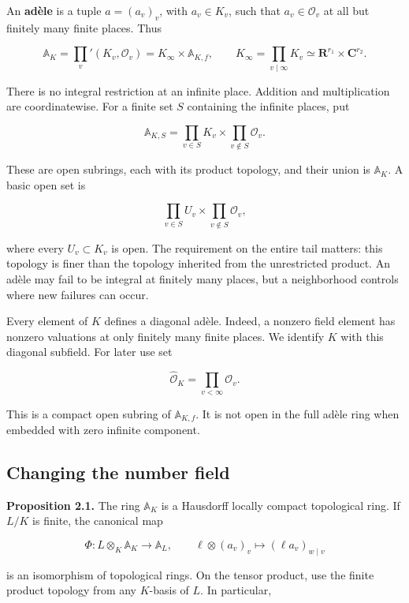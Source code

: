 \documentclass[
  english,
  11pt,
  a4paper,
]{article}
\begin{document}
An \textbf{adèle} is a tuple \(a=(a_v)_v\), with \(a_v\in K_v\), such
that \(a_v\in\mathcal O_v\) at all but finitely many finite places. Thus

\[\mathbb A_K=\prod_v'(K_v,\mathcal O_v)
=K_\infty\times\mathbb A_{K,f},
\qquad K_\infty=\prod_{v\mid\infty}K_v
\simeq\mathbf R^{r_1}\times\mathbf C^{r_2}.\]

There is no integral restriction at an infinite place. Addition and
multiplication are coordinatewise. For a finite set \(S\) containing the
infinite places, put

\[\mathbb A_{K,S}=\prod_{v\in S}K_v\times
\prod_{v\notin S}\mathcal O_v.\]

These are open subrings, each with its product topology, and their union
is \(\mathbb A_K\). A basic open set is

\[\prod_{v\in S}U_v\times\prod_{v\notin S}\mathcal O_v,
\tag{1}\]

where every \(U_v\subset K_v\) is open. The requirement on the entire
tail matters: this topology is finer than the topology inherited from
the unrestricted product. An adèle may fail to be integral at finitely
many places, but a neighborhood controls where new failures can occur.

Every element of \(K\) defines a diagonal adèle. Indeed, a nonzero field
element has nonzero valuations at only finitely many finite places. We
identify \(K\) with this diagonal subfield. For later use set

\[\widehat{\mathcal O}_K=\prod_{v<\infty}\mathcal O_v.\]

This is a compact open subring of \(\mathbb A_{K,f}\). It is not open in
the full adèle ring when embedded with zero infinite component.

\subsection{Changing the number
field}\label{NT-ADL-02--changing-the-number-field}

\textbf{Proposition 2.1.} The ring \(\mathbb A_K\) is a Hausdorff
locally compact topological ring. If \(L/K\) is finite, the canonical
map

\[\Phi:L\otimes_K\mathbb A_K\longrightarrow\mathbb A_L,
\qquad
\ell\otimes(a_v)_v\longmapsto(\ell a_v)_{w\mid v}
\tag{2}\]

is an isomorphism of topological rings. On the tensor product, use the
finite product topology from any \(K\)-basis of \(L\). In particular,
\end{document}
